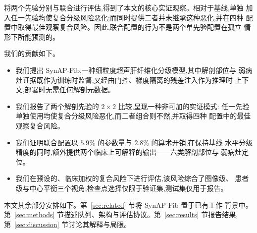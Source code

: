 将两个先验分别与联合进行评估,得到了本文的核心实证观察。相对于基线,单独
加入任一先验均使复合分级风险恶化;而同时提供二者并未继承这种恶化,并在四种
配置中取得最佳观察复合风险。因此,联合配置的行为不是两个单先验配置在孤立
情形下所能预测的。

我们的贡献如下。

\begin{itemize}
\item 我们提出 SynAP-Fib,一种细粒度超声肝纤维化分级模型,其中解剖部位与
      弱病灶证据既作为训练时监督,又经由门控、梯度隔离的残差注入作为推理时
      上下文,部署时无需任何解剖元数据。
\item 我们报告了两个解剖先验的 $2\times2$ 比较,呈现一种非可加的实证模式:
      任一先验单独使用均使复合分级风险恶化,而二者组合则不然,并取得四种
      配置中的最佳观察复合风险。
\item 我们证明联合配置以 $5.9\%$ 的参数量与 $2.8\%$ 的算术开销,在保持基线
      水平分级精度的同时,额外提供两个临床上可解释的输出——六类解剖部位与
      弱病灶定位。
\item 我们在预设的、临床加权的复合风险下进行评估,该风险综合了图像级、
      患者级与中心平衡三个视角;检查点选择仅限于验证集,测试集仅用于报告。
\end{itemize}

本文其余部分安排如下。第~\ref{sec:related} 节将 SynAP-Fib 置于已有工作
背景中。第~\ref{sec:methods} 节描述队列、架构与评估协议。第~\ref{sec:results}
节报告结果,第~\ref{sec:discussion} 节讨论其解释与局限。

